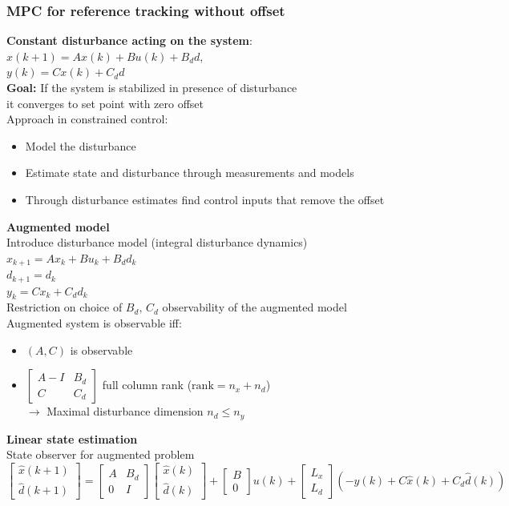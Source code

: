 \subsubsection{MPC for reference tracking without offset}
\textbf{Constant disturbance acting on the system}:
$x(k+1)=Ax(k)+Bu(k)+B_dd$,\\
$y(k)=Cx(k)+C_dd$\\
\textbf{Goal:} If the system is stabilized in presence of disturbance \\\rightarrow it converges to set point with zero offset\\
Approach in constrained control:
\begin{itemize}
    \item Model the disturbance
    \item Estimate state and disturbance through measurements and models 
    \item Through disturbance estimates find control inputs that remove the offset
\end{itemize}
\textbf{Augmented model}\\
Introduce disturbance model (integral disturbance dynamics)\\
$x_{k+1}=Ax_k+Bu_k+B_dd_k$\\
$d_{k+1}=d_k$\\
$y_k=Cx_k+C_dd_k$\\
Restriction on choice of $B_d,\,C_d$ \rightarrow observability of the augmented model\\
Augmented system is observable iff:
\begin{itemize}
    \item $(A,C)$ is observable
    \item $\begin{bmatrix}
        A-I&B_d\\C&C_d
    \end{bmatrix}$ full column rank ($\text{rank}=n_x+n_d$)\\
    $\rightarrow$ Maximal disturbance dimension $n_d\leq n_y$
\end{itemize}
\textbf{Linear state estimation}\\
State observer for augmented problem\\
$\begin{bmatrix}
    \hat{x}(k+1)\\\hat{d}(k+1)
\end{bmatrix}=\begin{bmatrix}
    A&B_d\\0&I
\end{bmatrix}\begin{bmatrix}
    \hat{x}(k)\\\hat{d}(k)
\end{bmatrix}+\begin{bmatrix}
    B\\0
\end{bmatrix}u(k)+\begin{bmatrix}
    L_x\\L_d
\end{bmatrix}(-y(k)+C\hat{x}(k)+C_d\hat{d}(k))$\\
